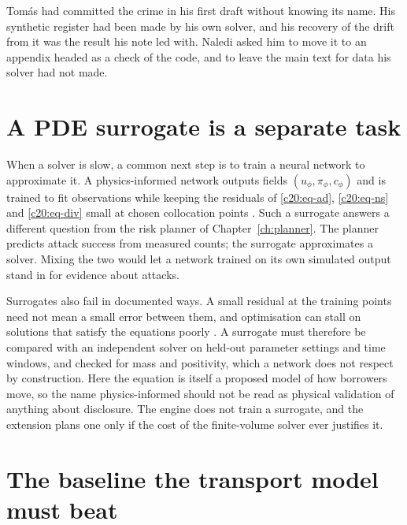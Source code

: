 Tom\'as had committed the crime in his first draft without knowing its name. His synthetic register had been made by his own solver, and his recovery of the drift from it was
the result his note led with. Naledi asked him to move it to an appendix headed as a check
of the code, and to leave the main text for data his solver had not made.

\section{A PDE surrogate is a separate task}

When a solver is slow, a common next step is to train a neural network to approximate
it. A physics-informed network outputs fields $(u_\phi,\pi_\phi,c_\phi)$ and is trained to fit observations
while keeping the residuals of \eqref{c20:eq-ad}, \eqref{c20:eq-ns} and \eqref{c20:eq-div} small at chosen collocation points
\citep{raissi2019}. Such a surrogate answers a different question from the risk planner
of Chapter~\ref{ch:planner}. The planner predicts attack success from measured counts; the surrogate
approximates a solver. Mixing the two would let a network trained on its own simulated
output stand in for evidence about attacks.

Surrogates also fail in documented ways. A small residual at the training points need
not mean a small error between them, and optimisation can stall on solutions that satisfy the
equations poorly \citep{krishnapriyan2021}. A surrogate must therefore be compared with
an independent solver on held-out parameter settings and time windows, and checked for
mass and positivity, which a network does not respect by construction. Here the equation
is itself a proposed model of how borrowers move, so the name physics-informed should
not be read as physical validation of anything about disclosure. The engine does not train
a surrogate, and the extension plans one only if the cost of the finite-volume solver ever
justifies it.

\section{The baseline the transport model must beat}\label{c20:sec-baseline}

